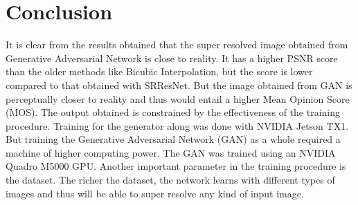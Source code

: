 \chapter{Conclusion}
It is clear from the results obtained that the super resolved image obtained from Generative Adversarial Network is close to reality. It has a higher PSNR score than the older methods like Bicubic Interpolation, but the score is lower compared to that obtained with SRResNet. But the image obtained from GAN is perceptually closer to reality and thus would entail a higher Mean Opinion Score (MOS).
The output obtained is constrained by the effectiveness of the training procedure. Training for the generator along was done with NVIDIA Jetson TX1. But training the Generative Adversarial Network (GAN) as a whole required a machine of higher computing power. The GAN was trained using an NVIDIA Quadro M5000 GPU. Another important parameter in the training procedure is the dataset. The richer the dataset, the network learns with different types of images and thus will be able to super resolve any kind of input image.
